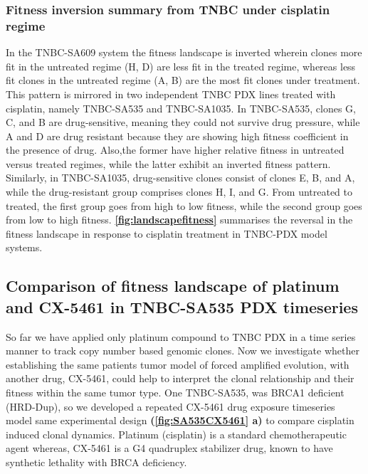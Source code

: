 \subsubsection{Fitness inversion summary from TNBC under cisplatin regime}
In the TNBC-SA609 system the fitness landscape is inverted wherein
clones more fit in the untreated regime (H, D) are less fit in the treated regime, whereas less fit clones in the untreated regime (A, B) are the most fit clones under treatment. This pattern is
mirrored in two independent TNBC PDX lines treated with cisplatin, namely TNBC-SA535 and TNBC-SA1035. In TNBC-SA535, clones G, C, and B are drug-sensitive, meaning they could not survive drug pressure, while A and D are drug resistant because they are showing high fitness coefficient in the presence of drug. Also,the former have higher relative fitness in untreated versus treated regimes, while the latter exhibit an inverted fitness pattern. Similarly, in TNBC-SA1035, drug-sensitive clones consist of clones E, B, and A, while the drug-resistant group comprises clones H, I, and G. From untreated
to treated, the first group goes from high to low fitness, while the second group goes from low to high fitness. \textbf{\autoref{fig:landscapefitness}} summarises the reversal in the fitness landscape in response to cisplatin treatment in TNBC-PDX model systems.



\subsection{Comparison of fitness landscape of platinum and CX-5461 in TNBC-SA535 PDX timeseries}
So far we have applied only platinum compound to TNBC PDX in a time series manner to track copy number based genomic clones. Now we investigate whether establishing the same patients tumor model of forced amplified evolution, with another drug, CX-5461, could help to interpret the clonal relationship and their fitness within the same tumor type.
One TNBC-SA535, was BRCA1 deficient (HRD-Dup), so we developed a repeated CX-5461 drug exposure timeseries model same experimental design \textbf{(\autoref{fig:SA535CX5461} a)} to compare cisplatin induced clonal dynamics. Platinum (cisplatin) is a standard chemotherapeutic agent whereas, CX-5461 is a G4 quadruplex stabilizer drug, known to have synthetic lethality with BRCA deficiency.

